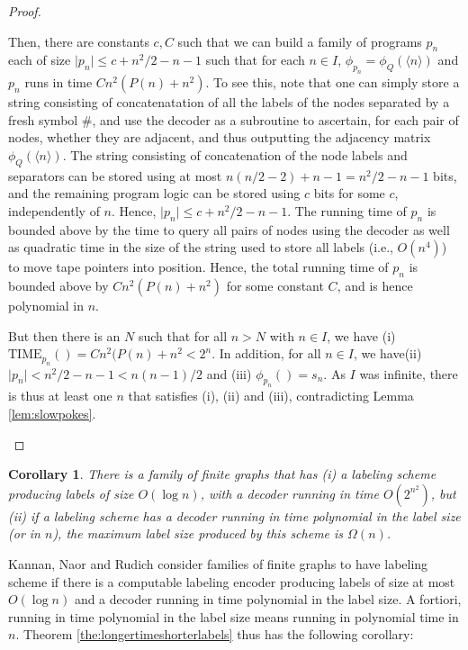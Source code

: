 \documentclass{article}
\newtheorem{corollary}{Corollary}
\newcommand{\bincode}[1]{\ensuremath{\langle #1 \rangle}}
\newcommand{\tmtime}[2]{\ensuremath{\mathrm{TIME}_{#1}(#2)}}
\begin{document}
\begin{proof}
\begin{itemize}
Then, there are constants $c,C$ such that we can build a family of programs $p_n$ each of size $\vert p_n \vert \leq c  + n^2/2 - n - 1$ such that for each $n \in I$, $\phi_{p_n} = \phi_Q(\bincode{n})$ and $p_n$
runs in time $C n^2 (P(n) + n^2)$. To see this, note that one can simply store a string consisting of concatenatation of all the labels of the nodes separated by a fresh symbol \#, and use the decoder as a subroutine to ascertain, for each pair
of nodes, whether they are adjacent, and thus outputting the adjacency matrix $\phi_Q(\bincode{n})$.
The string consisting of concatenation of the node labels and separators can be stored
using  at most $n (n/2 - 2) + n - 1 = n^2/2 - n - 1$ bits, and the remaining program logic can be stored using $c$
bits for some $c$, independently of $n$. Hence, $\vert p_n \vert \leq c + n^2/2 - n - 1$.
The running time of $p_n$ is bounded above by the time to query all pairs of nodes using the decoder as well
as quadratic time in the size of the string used to store all labels (i.e., $O(n^4)$) to move tape pointers into position.
Hence, the total running time of $p_n$ is bounded above by $C n^2 (P(n) + n^2)$ for some constant $C$,
and is hence polynomial in $n$. 

But then there is an $N$ such that for all $n > N$ with $n \in I$, we have (i) $\tmtime{p_n}{} = C n^2 (P(n) + n^2 < 2^n$. In addition, for all $n \in I$, we have(ii)  $\vert p_n \vert <  n^2/2 - n - 1 < n(n-1)/2$ and (iii) $\phi_{p_n}() = s_n$. 
As $I$ was infinite, there is thus at least one $n$ that satisfies (i), (ii) and (iii), contradicting Lemma \ref{lem:slowpokes}.
\end{itemize}

\end{proof}

\begin{corollary}
There is a family of finite graphs that has (i) a labeling scheme producing labels of size $O(\log n)$,
with a decoder running in time $O(2^{n^2})$, but (ii) if a labeling scheme has a decoder running in time polynomial
in the label size (or in $n$), the maximum label size produced by this scheme is $\Omega(n)$. 
\end{corollary}

Kannan, Naor and Rudich consider families of finite graphs to have labeling scheme if there is a computable
labeling encoder producing labels of size at most $O(\log n)$ and a decoder running in time polynomial in the label size.
A fortiori, running in time polynomial in the label size means running in polynomial time in $n$. Theorem \ref{the:longertimeshorterlabels} thus has the following corollary:
\end{document}
